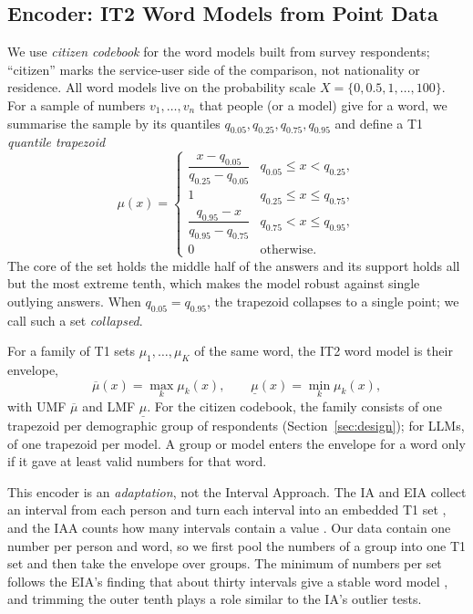 \subsection{Encoder: IT2 Word Models from Point Data}
\label{sec:concept-encoder}

We use \emph{citizen codebook} for the word models built from survey respondents; ``citizen'' marks the service-user
side of the comparison, not nationality or residence.
All word models live on the probability scale $X = \{0, 0.5, 1, \dots, 100\}$.
For a sample of numbers $v_1, \dots, v_n$ that people (or a model) give for a word, we summarise the sample by its
quantiles $q_{0.05}, q_{0.25}, q_{0.75}, q_{0.95}$ and define a T1 \emph{quantile trapezoid}
\begin{equation}
\mu(x) = \begin{cases}
\dfrac{x - q_{0.05}}{q_{0.25} - q_{0.05}} & q_{0.05} \le x < q_{0.25},\\[4pt]
1 & q_{0.25} \le x \le q_{0.75},\\[2pt]
\dfrac{q_{0.95} - x}{q_{0.95} - q_{0.75}} & q_{0.75} < x \le q_{0.95},\\[4pt]
0 & \text{otherwise.}
\end{cases}
\label{eq:trapezoid}
\end{equation}
The core of the set holds the middle half of the answers and its support holds all but the most extreme tenth, which
makes the model robust against single outlying answers.
When $q_{0.05} = q_{0.95}$, the trapezoid collapses to a single point; we call such a set \emph{collapsed}.

For a family of T1 sets $\mu_1, \dots, \mu_K$ of the same word, the IT2 word model is their envelope,
\begin{equation}
\overline{\mu}(x) = \max_{k} \mu_k(x), \qquad \underline{\mu}(x) = \min_{k} \mu_k(x),
\label{eq:envelope}
\end{equation}
with UMF $\overline{\mu}$ and LMF $\underline{\mu}$.
For the citizen codebook, the family consists of one trapezoid per demographic group of respondents (Section~\ref{sec:design}); for LLMs, of one
trapezoid per model.
A group or model enters the envelope for a word only if it gave at least \WMinN{} valid numbers for that word.

This encoder is an \emph{adaptation}, not the Interval Approach.
The IA and EIA collect an interval from each person and turn each interval into an embedded T1 set
\citep{liu2008ia,wu2012eia}, and the IAA counts how many intervals contain a value \citep{wagner2015iaa}.
Our data contain one number per person and word, so we first pool the numbers of a group into one T1 set and then take
the envelope over groups.
The minimum of \WMinN{} numbers per set follows the EIA's finding that about thirty intervals give a stable word model
\citep{wu2012eia}, and trimming the outer tenth plays a role similar to the IA's outlier tests.

